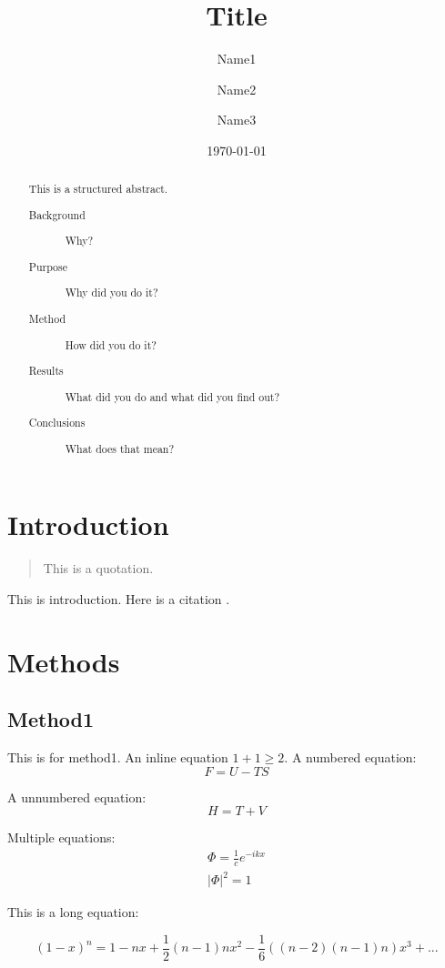 \documentclass[
aps, %
prb, 
twocolumn, %
10pt, %
superscriptaddress, %
amsfont, %
amssymb, %
amsmath, %
showkeys, %
floats, %
final, 
letterpaper, %
balancelastpage, %
flushbottom, %
citeautoscript,
]{revtex4-2}
\begin{document}
\title{Title}
\author{Name1}
\author{Name2}
\author{Name3}
\date{\today}

\begin{abstract}
This is a structured abstract.
\begin{description}
\item[Background] Why?
\item[Purpose] Why did you do it?
\item[Method] How did you do it?
\item[Results] What did you do and what did you find out?
\item[Conclusions] What does that mean?
\end{description}
\end{abstract}


\maketitle

\section{Introduction}
\begin{quotation}
This is a quotation.
\end{quotation}
This is introduction. Here is a citation \cite{PhysRevB.78.104104}.

\section{Methods}
\subsection{Method1}
This is for method1. An inline equation $1+1\geq2$.
A numbered equation:
\begin{equation}
F=U-TS
\end{equation}

A unnumbered equation:
\[H=T+V\]

Multiple equations:
\begin{eqnarray}
\Phi=\frac{1}{c}e^{-ikx}\\
|\Phi|^2=1
\end{eqnarray}

This is a long equation:
\begin{widetext}
\[(1-x)^n=1-nx+\frac{1}{2}(n-1)nx^2-\frac{1}{6}((n-2)(n-1)n)x^3+...\]
\end{widetext}
\end{document}
